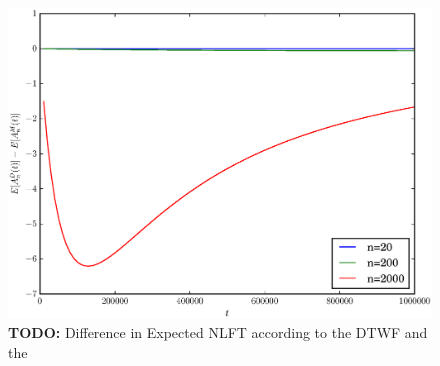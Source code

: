 \documentclass[11pt]{article}
\begin{document}
\begin{center}
	\begin{figure}[!ht]
		\begin{center}
			\includegraphics[scale=0.80]{../plots/moran_figure5}
		\end{center}
		\caption{\textbf{TODO: } Difference in Expected NLFT according to the DTWF and the}
	\end{figure}
\end{center}
\end{document}
